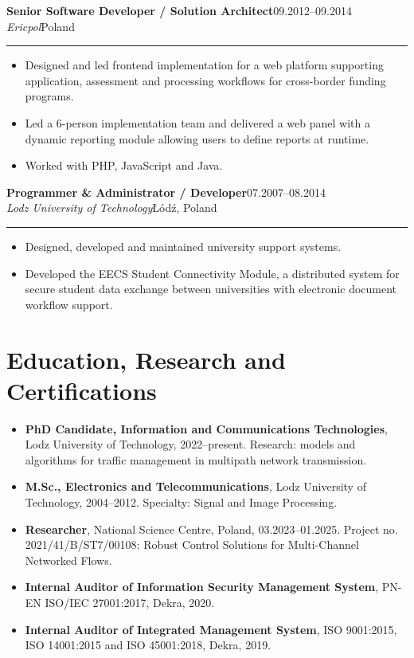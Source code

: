 \documentclass[10pt,a4paper]{article}
\newcommand{\role}[4]{%
  \Needspace{5\baselineskip}%
  \vspace{3pt}%
  {\bfseries\color{textmain}#1}\hfill {\small\color{textmuted}#2}\\[-1pt]
  {\itshape\color{accentdark}#3}\hfill {\small\color{textmuted}#4}\\[-4pt]
  {\color{linegray}\rule{\textwidth}{0.35pt}}\vspace{-3pt}
}
\begin{document}
\role{Senior Software Developer / Solution Architect}{09.2012--09.2014}{Ericpol}{Poland}
\begin{itemize}
  \item Designed and led frontend implementation for a web platform supporting application, assessment and processing workflows for cross-border funding programs.
  \item Led a 6-person implementation team and delivered a web panel with a dynamic reporting module allowing users to define reports at runtime.
  \item Worked with PHP, JavaScript and Java.
\end{itemize}

\role{Programmer \& Administrator / Developer}{07.2007--08.2014}{Lodz University of Technology}{Łódź, Poland}
\begin{itemize}
  \item Designed, developed and maintained university support systems.
  \item Developed the EECS Student Connectivity Module, a distributed system for secure student data exchange between universities with electronic document workflow support.
\end{itemize}

\section{Education, Research and Certifications}

\begin{itemize}
  \item \textbf{PhD Candidate, Information and Communications Technologies}, Lodz University of Technology, 2022--present. Research: models and algorithms for traffic management in multipath network transmission.
  \item \textbf{M.Sc., Electronics and Telecommunications}, Lodz University of Technology, 2004--2012. Specialty: Signal and Image Processing.
  \item \textbf{Researcher}, National Science Centre, Poland, 03.2023--01.2025. Project no. 2021/41/B/ST7/00108: Robust Control Solutions for Multi-Channel Networked Flows.
  \item \textbf{Internal Auditor of Information Security Management System}, PN-EN ISO/IEC 27001:2017, Dekra, 2020.
  \item \textbf{Internal Auditor of Integrated Management System}, ISO 9001:2015, ISO 14001:2015 and ISO 45001:2018, Dekra, 2019.
\end{itemize}
\end{document}
